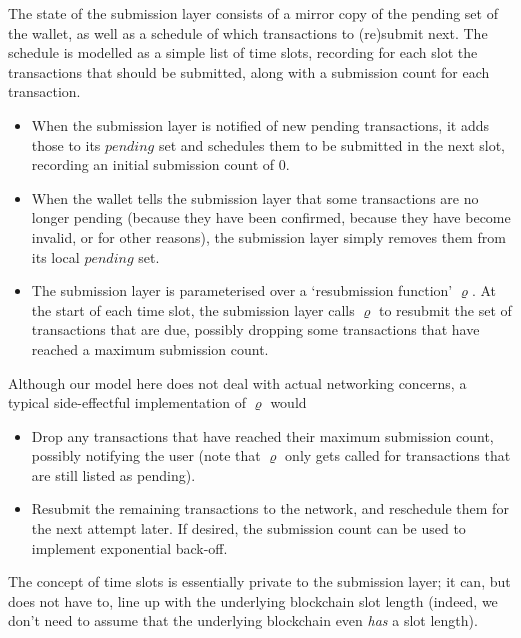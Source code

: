 \documentclass{article}
\theoremstyle{definition}{
  \newtheorem{lemma}{Lemma}[section] %
  \newtheorem{definition}[lemma]{Definition}
}
\theoremstyle{theorem}{
  \newtheorem{invariant}[lemma]{Invariant}
  \newtheorem{proofobligation}[lemma]{Proof Obligation}
}
\numberwithin{equation}{lemma}
\begin{document}
The state of the submission layer consists of a mirror copy of the pending set
of the wallet, as well as a schedule of which transactions to (re)submit next.
The schedule is modelled as a simple list of time slots, recording for each slot
the transactions that should be submitted, along with a submission count for
each transaction.
%
\begin{itemize}
\item When the submission layer is notified of new pending transactions,
it adds those to its $\mathit{pending}$ set and schedules them to be submitted
in the next slot, recording an initial submission count of 0.
\item When the wallet tells the submission layer that some transactions are
no longer pending (because they have been confirmed, because they have become
invalid, or for other reasons), the submission layer simply removes them
from its local $\mathit{pending}$ set.
\item The submission layer is parameterised over a `resubmission function'
$\varrho$. At the start of each time slot, the submission layer calls $\varrho$
to resubmit the set of transactions that are due, possibly dropping some
transactions that have reached a maximum submission count.
\end{itemize}

Although our model here does not deal with actual networking concerns, a
typical side-effectful implementation of $\varrho$ would
%
\begin{itemize}
\item Drop any transactions that have reached their maximum submission
count, possibly notifying the user
(note that $\varrho$ only gets called for transactions that are still listed as
pending).
\item Resubmit the remaining transactions to the network, and reschedule them
for the next attempt later. If desired, the submission count can be used to
implement exponential back-off.
\end{itemize}

The concept of time slots is essentially private to the submission layer; it
can, but does not have to, line up with the underlying blockchain slot length
(indeed, we don't need to assume that the underlying blockchain even \emph{has}
a slot length).
\end{document}
